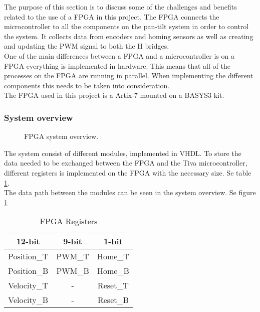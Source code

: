 \documentclass[../../../main]{subfiles}
\begin{document}
The purpose of this section is to discuss some of the challenges and benefits related to the use of a FPGA in this project.
The FPGA connects the microcontroller to all the components on the pan-tilt system in order to control the system. It collects data from encoders and homing sensors as well as creating and updating the PWM signal to both the H bridges.
\\
One of the main differences between a FPGA and a microcontroller is on a FPGA everything is implemented in hardware. This means that all of the processes on the FPGA are running in parallel. When implementing the different components this needs to be taken into consideration. 
\\
The FPGA used in this project is a Artix-7 mounted on a BASYS3 kit. 
\subsubsection{System overview}%
\label{sub:system_overview}

\begin{figure}[H]
  \centering
  \def\svgwidth{\textwidth}
  
  \caption{FPGA system overview.}
  \label{fig:FPGA_system_overview}
\end{figure}


The system consist of different modules, implemented in VHDL.
To store the data needed to be exchanged between the FPGA and the Tiva microcontroller, different registers is implemented on the FPGA with the necessary size. Se table \ref{table:FPGA_registers}. 
\\
The data path between the modules can be seen in the system overview. Se figure \ref{fig:FPGA_system_overview}
\begin{table}[H]
\centering
\begin{tabular}{|c|c|c|}
\hline
\textbf{12-bit} & \textbf{9-bit} & \textbf{1-bit} \\ \hline
Position\_T     & PWM\_T         & Home\_T        \\ \hline
Position\_B     & PWM\_B         & Home\_B        \\ \hline
Velocity\_T     & -              & Reset\_T       \\ \hline
Velocity\_B     & -              & Reset\_B       \\ \hline
\end{tabular}
\caption{FPGA Registers}
\label{table:FPGA_registers}
\end{table}
\end{document}

